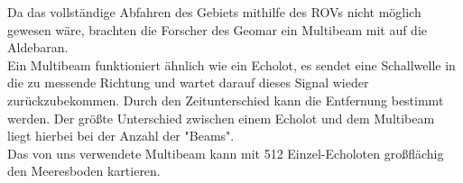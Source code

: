  

Da das vollständige Abfahren des Gebiets mithilfe des ROVs nicht möglich gewesen wäre, 
brachten die Forscher des Geomar ein Multibeam mit auf die Aldebaran. \\
Ein Multibeam funktioniert ähnlich wie ein Echolot, es sendet eine Schallwelle in die zu messende 
Richtung und wartet darauf dieses Signal wieder zurückzubekommen. Durch den Zeitunterschied 
kann die Entfernung bestimmt werden. Der größte Unterschied zwischen einem Echolot und dem Multibeam 
liegt hierbei bei der Anzahl der "Beams". \\
Das von uns verwendete Multibeam kann mit 512 Einzel-Echoloten großflächig den Meeresboden kartieren. 
